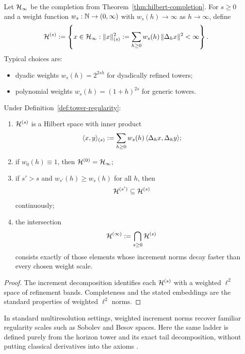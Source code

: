 \begin{definition}
\label{def:tower-regularity}
Let $\mathcal{H}_\infty$ be the completion from
Theorem~\ref{thm:hilbert-completion}. For $s\ge 0$ and a weight function
$w_s:\mathbb{N}\to(0,\infty)$ with $w_s(h)\to\infty$ as $h\to\infty$, define
\[
\mathcal{H}^{(s)}
:=
\left\{
x\in\mathcal{H}_\infty:
\|x\|_{(s)}^2
:=
\sum_{h\ge 0} w_s(h)\,\|\Delta_{h}x\|^2
<
\infty
\right\}.
\]
Typical choices are:
\begin{itemize}[itemsep=0.2em]
\item dyadic weights $w_s(h)=2^{2sh}$ for dyadically refined towers;
\item polynomial weights $w_s(h)=(1+h)^{2s}$ for generic towers.
\end{itemize}
\end{definition}

\begin{proposition}
\label{prop:regularity-ladder}
Under Definition~\ref{def:tower-regularity}:
\begin{enumerate}[label=(\roman*), leftmargin=2em, itemsep=0.2em]
\item $\mathcal{H}^{(s)}$ is a Hilbert space with inner product
      \[
      \langle x,y\rangle_{(s)}
      :=
      \sum_{h\ge 0} w_s(h)\,\langle \Delta_{h}x,\Delta_{h}y\rangle;
      \]
\item if $w_0(h)\equiv 1$, then $\mathcal{H}^{(0)}=\mathcal{H}_\infty$;
\item if $s'>s$ and $w_{s'}(h)\ge w_s(h)$ for all $h$, then
      \[
      \mathcal{H}^{(s')}\subseteq \mathcal{H}^{(s)}
      \]
      continuously;
\item the intersection
      \[
      \mathcal{H}^{(\infty)}:=\bigcap_{s\ge 0}\mathcal{H}^{(s)}
      \]
      consists exactly of those elements whose increment norms decay faster than
      every chosen weight scale.
\end{enumerate}
\end{proposition}

\begin{proof}
The increment decomposition identifies each $\mathcal{H}^{(s)}$ with a weighted
$\ell^2$ space of refinement bands. Completeness and the stated embeddings are
the standard properties of weighted $\ell^2$ norms.
\end{proof}

\begin{remark}
\label{rem:regularity-model}
In standard multiresolution settings, weighted increment norms recover familiar
regularity scales such as Sobolev and Besov spaces. Here the same ladder is
defined purely from the horizon tower and its exact tail decomposition, without
putting classical derivatives into the axioms
\cite{AdamsFournier2003,Triebel1983,Mallat1989,Daubechies1992}.
\end{remark}

